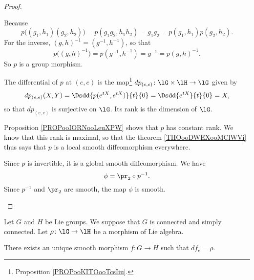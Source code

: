 \begin{proof}
\begin{subproof}
\begin{subproof}
        \spitem[Morphism]
            Because
            \begin{equation}
                p\big( (g_1,h_1)(g_2,h_2) \big)=p(g_1g_2,h_1h_2)=g_1g_2=p(g_1,h_1)p(g_2,h_2).
            \end{equation}
            For the inverse, \( (g,h)^{-1}=(g^{-1},h^{-1})\), so that 
            \begin{equation}
                p\big( (g,h)^{-1}\big)=p(g^{-1},h^{-1})=g^{-1}=p(g,h)^{-1}.
            \end{equation}
            So \( p\) is a group morphism.
        \end{subproof}
        The differential of \( p\) at \( (e,e)\) is the map\footnote{Proposition \ref{PROPooKITOooTcsIiu}.} \( dp_{(e,e)}\colon \lG\times \lH\to \lG\) given by
        \begin{equation}
            dp_{(e,e)}(X,Y)=\Dsdd{ p( e^{tX},  e^{tX}) }{t}{0}=\Dsdd{  e^{tX} }{t}{0}=X,
        \end{equation}
        so that \( dp_{(e,e)}\) is surjective on \( \lG\). Its rank is the dimension of \( \lG\).

        Proposition \ref{PROPooIORNooLeuXPW} shows that \( p\) has constant rank. We know that this rank is maximal, so that the theorem \ref{THOooDWEXooMClWVi} thus says that \( p\) is a local smooth diffeomorphism everywhere.

        Since \( p\) is invertible, it is a global smooth diffeomorphism.
    \spitem[Conclusion]
        We have
        \begin{equation}
            \phi=\pr_2\circ p^{-1}.
        \end{equation}
        Since \( p^{-1}\) and \( \pr_2\) are smooth, the map \( \phi\) is smooth.
    \end{subproof}
\end{proof}

\begin{theorem}       \label{THOooZAEYooXCdxKI}
    Let \( G\) and \( H\) be Lie groups. We suppose that \( G\) is connected and simply connected. Let \( \rho\colon \lG\to \lH\) be a morphism of Lie algebra.

    There exists an unique smooth morphism \( f\colon G\to H\) such that \( df_e=\rho\).
\end{theorem}

